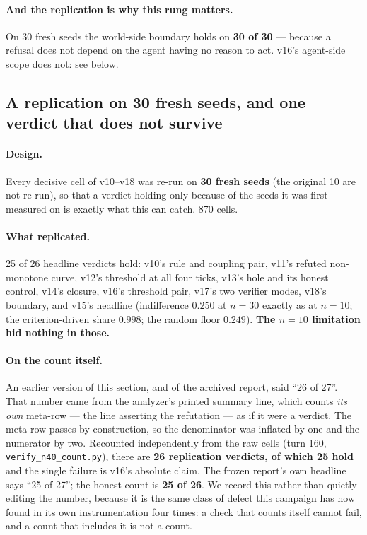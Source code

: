 \documentclass[11pt]{article}
\begin{document}
\paragraph{And the replication is why this rung matters.} On 30 fresh seeds the
world-side boundary holds on \textbf{30 of 30} --- because a refusal does not depend on
the agent having no reason to act. v16's agent-side scope does not: see below.

\subsection{A replication on 30 fresh seeds, and one verdict that does not survive}
\label{sec:n40}

\paragraph{Design.} Every decisive cell of v10--v18 was re-run on \textbf{30 fresh
seeds} (the original 10 are not re-run), so that a verdict holding only because of the
seeds it was first measured on is exactly what this can catch. 870 cells.

\paragraph{What replicated.} 25 of 26 headline verdicts hold: v10's rule and
coupling pair, v11's refuted non-monotone curve, v12's threshold at all four ticks,
v13's hole and its honest control, v14's closure, v16's threshold pair, v17's two
verifier modes, v18's boundary, and v15's headline (indifference $0.250$ at
$n=30$ exactly as at $n=10$; the criterion-driven share $0.998$; the random floor
$0.249$). \textbf{The $n = 10$ limitation hid nothing in those.}

\paragraph{On the count itself.} An earlier version of this section, and of the
archived report, said ``26 of 27''. That number came from the analyzer's printed
summary line, which counts \emph{its own} meta-row --- the line asserting the
refutation --- as if it were a verdict. The meta-row passes by construction, so the
denominator was inflated by one and the numerator by two. Recounted independently from
the raw cells (turn 160, \texttt{verify\_n40\_count.py}), there are \textbf{26
replication verdicts, of which 25 hold} and the single failure is v16's absolute claim.
The frozen report's own headline says ``25 of 27''; the honest count is \textbf{25 of
26}. We record this rather than quietly editing the number, because it is the same
class of defect this campaign has now found in its own instrumentation four times: a
check that counts itself cannot fail, and a count that includes it is not a count.
\end{document}

